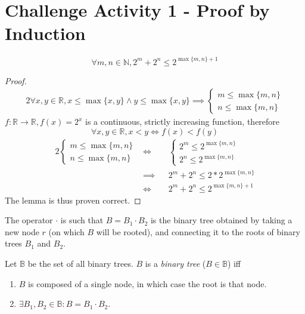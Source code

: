 \documentclass[docid=CA01]{tcom_CA}
\begin{document}
\setcounter{section}{0}
\section{Challenge Activity 1 - Proof by Induction}
\begin{lemma} \label{lem:CA01_max}
\begin{equation*}
	\forall m,n \in \mathbb{N}, 2^m+2^n \leq 2^{\max \{m,n\} +1}
\end{equation*}
\end{lemma}
\begin{proof}
\begin{alignat*}{2}
	\forall x,y \in \mathbb{R}, x \leq \max \{x,y\} \wedge y \leq \max \{x,y\}
	\implies \begin{cases}
		m \leq \max \{ m,n\}\\
		n \leq \max \{ m,n\}
	\end{cases}
\end{alignat*}
$f \colon \mathbb{R} \rightarrow \mathbb{R}, f(x)=2^x$ is a continuous, strictly increasing function, therefore
\begin{equation*}
	\forall x,y \in \mathbb{R}, x<y \iff f(x) < f(y)
\end{equation*}
\begin{alignat*}{2}
	\begin{cases}
		m \leq \max \{ m,n\}\\
		n \leq \max \{ m,n\}
	\end{cases}
	&\iff &&
	\begin{cases}
		2^m \leq 2^{\max \{ m,n\}}\\
		2^n \leq 2^{\max \{ m,n\}}
	\end{cases}\\
	&\implies && 2^m+2^n \leq 2 * 2^{\max \{m,n\}}\\
	&\iff     && 2^m+2^n \leq 2^{\max \{m,n\} +1}
\end{alignat*}
The lemma is thus proven correct.
\end{proof}
\begin{definition}
	The operator $\cdot$ is such that $B=B_1 \cdot B_2$ is the binary tree obtained by taking a new node $r$ (on which $B$ will be rooted), and connecting it to the roots of binary trees $B_1$ and $B_2$.
\end{definition}
\begin{definition}
Let $\mathbb{B}$ be the set of all binary trees.
$B$ is a \textit{binary tree} ($B \in \mathbb{B}$) iff
\begin{enumerate}
	\item \label{def:BT1} $B$ is composed of a single node, in which case the root is that node.
	\item \label{def:BT2} $\exists B_1,B_2 \in \mathbb{B} \colon B=B_1 \cdot B_2$.
\end{enumerate}
\end{definition}
\end{document}
